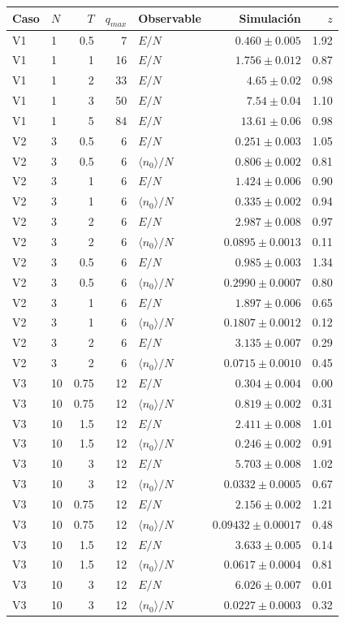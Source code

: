 \begin{tabular}{llrrlrr}
\hline
Caso & $N$ & $T$ & $q_{max}$ & Observable & Simulación & $z$ \\
\hline
V1 & 1 & 0.5 & 7 & $E/N$ & $0.460 \pm 0.005$ & 1.92 \\
V1 & 1 & 1 & 16 & $E/N$ & $1.756 \pm 0.012$ & 0.87 \\
V1 & 1 & 2 & 33 & $E/N$ & $4.65 \pm 0.02$ & 0.98 \\
V1 & 1 & 3 & 50 & $E/N$ & $7.54 \pm 0.04$ & 1.10 \\
V1 & 1 & 5 & 84 & $E/N$ & $13.61 \pm 0.06$ & 0.98 \\
V2 & 3 & 0.5 & 6 & $E/N$ & $0.251 \pm 0.003$ & 1.05 \\
V2 & 3 & 0.5 & 6 & $\langle n_0\rangle/N$ & $0.806 \pm 0.002$ & 0.81 \\
V2 & 3 & 1 & 6 & $E/N$ & $1.424 \pm 0.006$ & 0.90 \\
V2 & 3 & 1 & 6 & $\langle n_0\rangle/N$ & $0.335 \pm 0.002$ & 0.94 \\
V2 & 3 & 2 & 6 & $E/N$ & $2.987 \pm 0.008$ & 0.97 \\
V2 & 3 & 2 & 6 & $\langle n_0\rangle/N$ & $0.0895 \pm 0.0013$ & 0.11 \\
V2 & 3 & 0.5 & 6 & $E/N$ & $0.985 \pm 0.003$ & 1.34 \\
V2 & 3 & 0.5 & 6 & $\langle n_0\rangle/N$ & $0.2990 \pm 0.0007$ & 0.80 \\
V2 & 3 & 1 & 6 & $E/N$ & $1.897 \pm 0.006$ & 0.65 \\
V2 & 3 & 1 & 6 & $\langle n_0\rangle/N$ & $0.1807 \pm 0.0012$ & 0.12 \\
V2 & 3 & 2 & 6 & $E/N$ & $3.135 \pm 0.007$ & 0.29 \\
V2 & 3 & 2 & 6 & $\langle n_0\rangle/N$ & $0.0715 \pm 0.0010$ & 0.45 \\
V3 & 10 & 0.75 & 12 & $E/N$ & $0.304 \pm 0.004$ & 0.00 \\
V3 & 10 & 0.75 & 12 & $\langle n_0\rangle/N$ & $0.819 \pm 0.002$ & 0.31 \\
V3 & 10 & 1.5 & 12 & $E/N$ & $2.411 \pm 0.008$ & 1.01 \\
V3 & 10 & 1.5 & 12 & $\langle n_0\rangle/N$ & $0.246 \pm 0.002$ & 0.91 \\
V3 & 10 & 3 & 12 & $E/N$ & $5.703 \pm 0.008$ & 1.02 \\
V3 & 10 & 3 & 12 & $\langle n_0\rangle/N$ & $0.0332 \pm 0.0005$ & 0.67 \\
V3 & 10 & 0.75 & 12 & $E/N$ & $2.156 \pm 0.002$ & 1.21 \\
V3 & 10 & 0.75 & 12 & $\langle n_0\rangle/N$ & $0.09432 \pm 0.00017$ & 0.48 \\
V3 & 10 & 1.5 & 12 & $E/N$ & $3.633 \pm 0.005$ & 0.14 \\
V3 & 10 & 1.5 & 12 & $\langle n_0\rangle/N$ & $0.0617 \pm 0.0004$ & 0.81 \\
V3 & 10 & 3 & 12 & $E/N$ & $6.026 \pm 0.007$ & 0.01 \\
V3 & 10 & 3 & 12 & $\langle n_0\rangle/N$ & $0.0227 \pm 0.0003$ & 0.32 \\
\hline
\end{tabular}